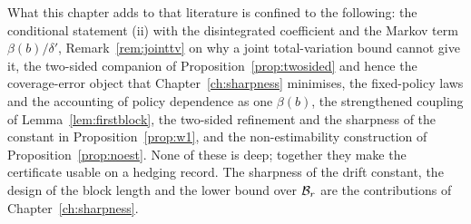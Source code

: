 \documentclass[../../../main.tex]{subfiles}
\begin{document}
What this chapter adds to that literature is confined to the following: the conditional statement (ii) with the disintegrated coefficient and the Markov term $\beta(b)/\delta'$, Remark~\ref{rem:jointtv} on why a joint total-variation bound cannot give it, the two-sided companion of Proposition~\ref{prop:twosided} and hence the coverage-error object that Chapter~\ref{ch:sharpness} minimises, the fixed-policy laws and the accounting of policy dependence as one $\beta(b)$, the strengthened coupling of Lemma~\ref{lem:firstblock}, the two-sided refinement and the sharpness of the constant in Proposition~\ref{prop:w1}, and the non-estimability construction of Proposition~\ref{prop:noest}. None of these is deep; together they make the certificate usable on a hedging record. The sharpness of the drift constant, the design of the block length and the lower bound over $\mathcal B_{r}$ are the contributions of Chapter~\ref{ch:sharpness}.
\end{document}
